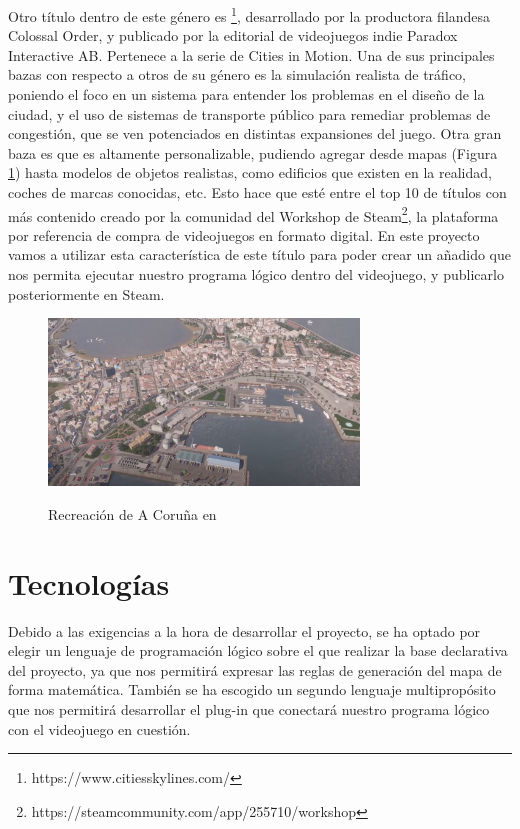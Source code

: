 Otro título dentro de este género es \cities\footnote{https://www.citiesskylines.com/}, desarrollado por la productora filandesa Colossal Order, y publicado por la editorial de videojuegos indie Paradox Interactive AB. Pertenece a la serie de Cities in Motion\textcopyright. Una de sus principales bazas con respecto a otros de su género es la simulación realista de tráfico, poniendo el foco en un sistema para entender los problemas en el diseño de la ciudad, y el uso de sistemas de transporte público para remediar problemas de congestión, que se ven potenciados en distintas expansiones del juego. Otra gran baza es que es altamente personalizable, pudiendo agregar desde mapas (Figura \ref{fig:cities}) hasta modelos de objetos realistas, como edificios que existen en la realidad, coches de marcas conocidas, etc. Esto hace que esté entre el top 10 de títulos con más contenido creado por la comunidad del Workshop de Steam\footnote{https://steamcommunity.com/app/255710/workshop}, la plataforma por referencia de compra de videojuegos en formato digital. En este proyecto vamos a utilizar esta característica de este título para poder crear un añadido que nos permita ejecutar nuestro programa lógico dentro del videojuego, y publicarlo posteriormente en Steam.

\begin{figure}[h]
	\centering
	\includegraphics[height=12em]{images/CitiesCoruna}
	\label{fig:cities}
	\caption{Recreación de A Coruña en \cities}
\end{figure}

\section{Tecnologías}

Debido a las exigencias a la hora de desarrollar el proyecto, se ha optado por elegir un lenguaje de programación lógico sobre el que realizar la base declarativa del proyecto, ya que nos permitirá expresar las reglas de generación del mapa de forma matemática. También se ha escogido un segundo lenguaje multipropósito que nos permitirá desarrollar el plug-in que conectará nuestro programa lógico con el videojuego en cuestión.

